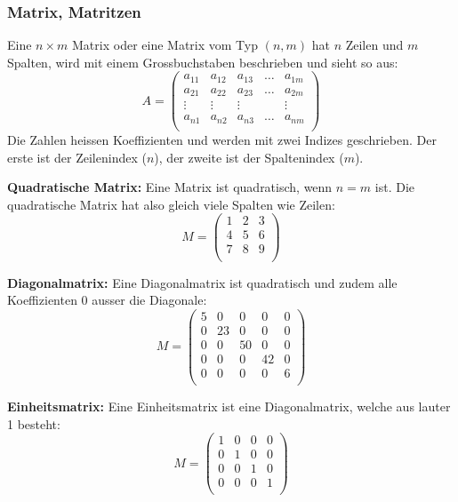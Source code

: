 \subsubsection{Matrix, Matritzen}
Eine $n \times m$ Matrix oder eine Matrix vom Typ $(n, m)$ hat $n$ Zeilen
und $m$ Spalten, wird mit einem Grossbuchstaben beschrieben und sieht so aus:
\[ A = \begin {pmatrix}
  a_{11} & a_{12} & a_{13} & \hdots & a_{1m} \\
  a_{21} & a_{22} & a_{23} & \hdots & a_{2m} \\
  \vdots  & \vdots  & \vdots  &        & \vdots  \\
  a_{n1} & a_{n2} & a_{n3} & \hdots & a_{nm} \\
\end {pmatrix} \]
Die Zahlen heissen Koeffizienten und werden mit zwei Indizes
geschrieben. Der erste ist der Zeilenindex ($n$), der zweite ist der
Spaltenindex ($m$).

\textbf{Quadratische Matrix:} Eine Matrix ist quadratisch, wenn $n = m$ ist.
Die quadratische Matrix hat also gleich viele Spalten wie Zeilen:
\[ M = \begin {pmatrix}
 1  & 2 & 3  \\
 4  & 5 & 6  \\
 7  & 8 & 9  \\
\end {pmatrix} \]


\textbf{Diagonalmatrix:} Eine Diagonalmatrix ist quadratisch und zudem
alle Koeffizienten $0$ ausser die Diagonale:
\[ M = \begin {pmatrix}
 5  & 0  & 0  & 0  & 0  \\
 0  & 23  & 0  & 0  & 0  \\
 0  & 0  & 50  & 0  & 0  \\
 0  & 0  & 0  & 42  & 0  \\
 0  & 0  & 0  & 0  & 6  \\
\end {pmatrix} \]

\textbf{Einheitsmatrix:} Eine Einheitsmatrix ist eine Diagonalmatrix,
welche aus lauter 1 besteht:
\[ M = \begin {pmatrix}
 1  & 0  & 0  & 0 \\
 0  & 1  & 0  & 0 \\
 0  & 0  & 1  & 0 \\
 0  & 0  & 0  & 1 \\
\end {pmatrix} \]

